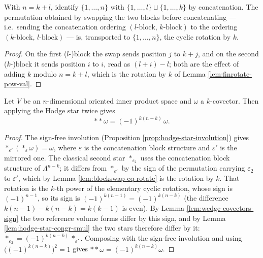 \begin{lemma}
\label{lem:blockswap-eq-rotate}
\leanok
{}
With $n = k + l$, identify $\{1,\ldots,n\}$ with $\{1,\ldots,l\} \sqcup \{1,\ldots,k\}$ by concatenation. The permutation obtained by swapping the two blocks before concatenating --- i.e.\ sending the concatenation ordering $(l\text{-block},\, k\text{-block})$ to the ordering $(k\text{-block},\, l\text{-block})$ --- is, transported to $\{1,\ldots,n\}$, the cyclic rotation by $k$.
\end{lemma}
\begin{proof}
\leanok
On the first ($l$-)block the swap sends position $j$ to $k + j$, and on the second ($k$-)block it sends position $i$ to $i$, read as $(l + i) - l$; both are the effect of adding $k$ modulo $n = k + l$, which is the rotation by $k$ of Lemma \ref{lem:finrotate-pow-val}.
\end{proof}

\begin{proposition}
\label{prop:hodge-star-classical-involution}
\leanok
{}
Let $V$ be an $n$-dimensional oriented inner product space and $\omega$ a $k$-covector. Then applying the Hodge star twice gives
\[
{*}{*}\omega = (-1)^{k(n-k)}\,\omega.
\]
\end{proposition}
\begin{proof}
\leanok
The sign-free involution (Proposition \ref{prop:hodge-star-involution}) gives ${*}_{\varepsilon'}({*}_{\varepsilon}\omega) = \omega$, where $\varepsilon$ is the concatenation block structure and $\varepsilon'$ is the mirrored one. The classical second star ${*}_{\varepsilon_2}$ uses the concatenation block structure of $\Lambda^{n-k}$; it differs from ${*}_{\varepsilon'}$ by the sign of the permutation carrying $\varepsilon_2$ to $\varepsilon'$, which by Lemma \ref{lem:blockswap-eq-rotate} is the rotation by $k$. That rotation is the $k$-th power of the elementary cyclic rotation, whose sign is $(-1)^{n-1}$, so its sign is $(-1)^{k(n-1)} = (-1)^{k(n-k)}$ (the difference $k(n-1) - k(n-k) = k(k-1)$ is even). By Lemma \ref{lem:wedge-covectors-sign} the two reference volume forms differ by this sign, and by Lemma \ref{lem:hodge-star-congr-smul} the two stars therefore differ by it: ${*}_{\varepsilon_2} = (-1)^{k(n-k)}\,{*}_{\varepsilon'}$. Composing with the sign-free involution and using $\big((-1)^{k(n-k)}\big)^2 = 1$ gives ${*}{*}\omega = (-1)^{k(n-k)}\omega$.
\end{proof}

